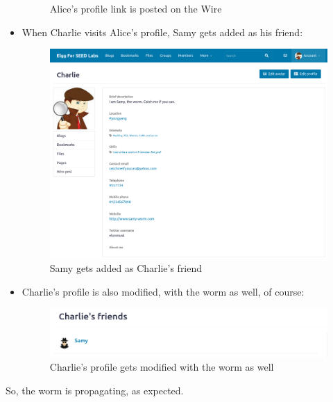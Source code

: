 \documentclass[12pt]{article}
\begin{document}
\begin{itemize}
\begin{figure}[H]
         \caption{Alice's profile link is posted on the Wire}
         \label{fig:ss12}
     \end{figure}
 \item When Charlie visits Alice's profile, Samy gets added as his friend:
     \begin{figure}[H]
         \centering
         \includegraphics[width=\textwidth]{Images/ss13.png}
         \caption{Samy gets added as Charlie's friend}
         \label{fig:ss13}
     \end{figure}
 \item Charlie's profile is also modified, with the worm as well, of course:
     \begin{figure}[H]
         \centering
         \includegraphics[width=\textwidth]{Images/ss14.png}
         \caption{Charlie's profile gets modified with the worm as well}
         \label{fig:ss14}
     \end{figure}
\end{itemize}
So, the worm is propagating, as expected.
\end{document}
